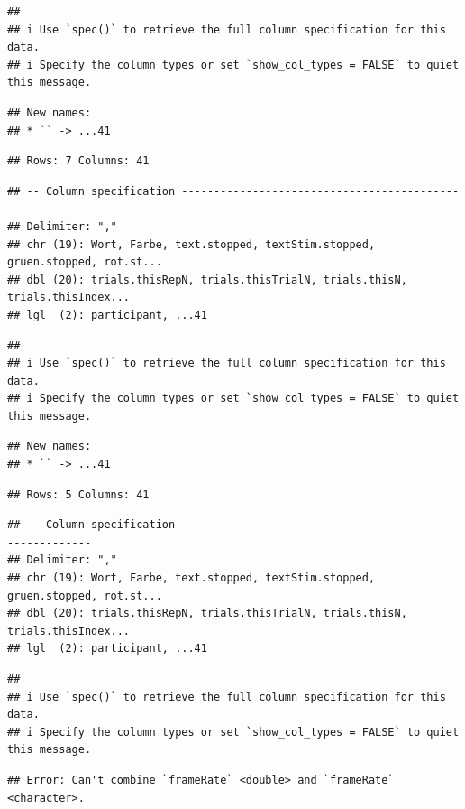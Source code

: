 \documentclass[
]{book}
\begin{document}
\begin{verbatim}
## 
## i Use `spec()` to retrieve the full column specification for this data.
## i Specify the column types or set `show_col_types = FALSE` to quiet this message.
\end{verbatim}

\begin{verbatim}
## New names:
## * `` -> ...41
\end{verbatim}

\begin{verbatim}
## Rows: 7 Columns: 41
\end{verbatim}

\begin{verbatim}
## -- Column specification --------------------------------------------------------
## Delimiter: ","
## chr (19): Wort, Farbe, text.stopped, textStim.stopped, gruen.stopped, rot.st...
## dbl (20): trials.thisRepN, trials.thisTrialN, trials.thisN, trials.thisIndex...
## lgl  (2): participant, ...41
\end{verbatim}

\begin{verbatim}
## 
## i Use `spec()` to retrieve the full column specification for this data.
## i Specify the column types or set `show_col_types = FALSE` to quiet this message.
\end{verbatim}

\begin{verbatim}
## New names:
## * `` -> ...41
\end{verbatim}

\begin{verbatim}
## Rows: 5 Columns: 41
\end{verbatim}

\begin{verbatim}
## -- Column specification --------------------------------------------------------
## Delimiter: ","
## chr (19): Wort, Farbe, text.stopped, textStim.stopped, gruen.stopped, rot.st...
## dbl (20): trials.thisRepN, trials.thisTrialN, trials.thisN, trials.thisIndex...
## lgl  (2): participant, ...41
\end{verbatim}

\begin{verbatim}
## 
## i Use `spec()` to retrieve the full column specification for this data.
## i Specify the column types or set `show_col_types = FALSE` to quiet this message.
\end{verbatim}

\begin{verbatim}
## Error: Can't combine `frameRate` <double> and `frameRate` <character>.
\end{verbatim}
\end{document}
